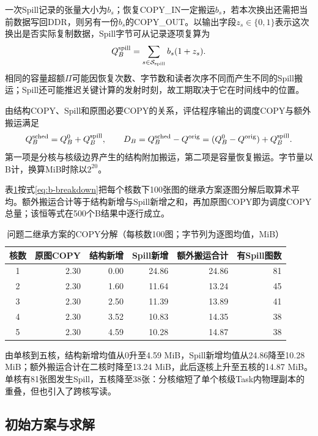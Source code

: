 一次Spill记录的张量大小为$b_s$；恢复COPY\_IN一定搬运$b_s$，若本次换出还需把当前数据写回DDR，则另有一份$b_s$的COPY\_OUT。以输出字段$z_s\in\{0,1\}$表示这次换出是否实际复制数据，Spill字节可从记录逐项复算为
\begin{equation}
Q_B^{\rm spill}=\sum_{s\in\mathcal S_{\rm spill}} b_s(1+z_s).
\label{eq:b-spill}
\end{equation}
相同的容量超额$\Pi$可能因恢复次数、字节数和读者次序不同而产生不同的Spill搬运；Spill还可能推迟关键计算的发射时刻，故工期取决于它在时间线中的位置。

由结构COPY、Spill和原图必要COPY的关系，评估程序输出的调度COPY与额外搬运满足
\begin{equation}
Q_B^{\rm sched}=Q_B^0+Q_B^{\rm spill},\qquad
D_B=Q_B^{\rm sched}-Q^{\rm orig}
=(Q_B^0-Q^{\rm orig})+Q_B^{\rm spill}.
\label{eq:b-breakdown}
\end{equation}
第一项是分核与核级边界产生的结构附加搬运，第二项是容量恢复搬运。字节量以B计，换算MiB时除以$2^{20}$。

表\ref{tab:b-copy-ledger}按式\eqref{eq:b-breakdown}把每个核数下100张图的继承方案逐图分解后取算术平均。额外搬运合计等于结构新增与Spill新增之和，再加原图COPY即为调度COPY总量；该恒等式在500个B结果中逐行成立。

\begin{table}[H]\centering\small
\caption{问题二继承方案的COPY分解（每核数100图；字节列为逐图均值，MiB）}\label{tab:b-copy-ledger}
\begin{tabular}{crrrrr}\toprule
核数 & 原图COPY & 结构新增 & Spill新增 & 额外搬运合计 & 有Spill图数\\\midrule
1 & 2.30 & 0.00 & 24.86 & 24.86 & 81\\
2 & 2.30 & 1.60 & 11.64 & 13.24 & 45\\
3 & 2.30 & 2.50 & 11.39 & 13.89 & 41\\
4 & 2.30 & 3.52 & 10.83 & 14.35 & 38\\
5 & 2.30 & 4.59 & 10.28 & 14.87 & 38\\\bottomrule
\end{tabular}\end{table}

由单核到五核，结构新增均值从0升至4.59 MiB，Spill新增均值从24.86降至10.28 MiB；额外搬运合计在二核时降至13.24 MiB，此后逐核上升至五核的14.87 MiB。单核有81张图发生Spill，五核降至38张：分核缩短了单个核级Task内物理副本的重叠，但也引入了跨核写读。

\subsection{初始方案与求解}
